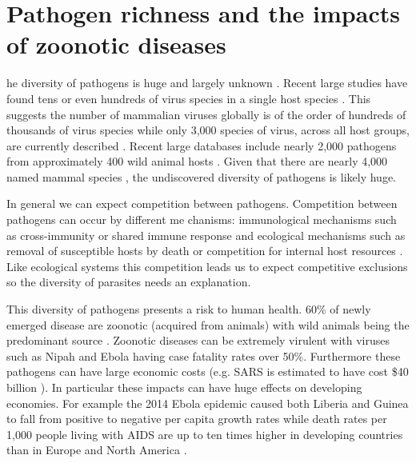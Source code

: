 
\section{Pathogen richness and the impacts of zoonotic diseases}



he diversity of pathogens is huge and largely unknown \cite{poulin2014parasite}.
Recent large studies have found tens \cite{anthony2013strategy} or even hundreds of virus species in a single host species \cite{anthony2015non}.
This suggests the number of mammalian viruses globally is of the order of hundreds of thousands of virus species \cite{anthony2013strategy} while only 3,000 species of virus, across all host groups, are currently described \cite{ICTV}.
Recent large databases include nearly 2,000 pathogens from approximately 400 wild animal hosts \cite{wardeh2015database}.
Given that there are nearly 4,000 named mammal species \cite{wilson2005mammal}, the undiscovered diversity of pathogens is likely huge.

In general we can expect competition between pathogens.
Competition between pathogens can occur by different me	chanisms: immunological mechanisms such as cross-immunity or shared immune response \cite{fenton2010applying} and ecological mechanisms such as removal of susceptible hosts by death \cite{rohani2003ecological} or competition for internal host resources \cite{griffiths2014analysis}.
Like ecological systems this competition leads us to expect competitive exclusions \cite{bremermann1989competitive, martcheva2013competitive, ackleh2003competitive, ackleh2014robust, turner2002impact} so the diversity of parasites needs an explanation.


This diversity of pathogens presents a risk to human health.
60\% of newly emerged disease are zoonotic (acquired from animals) with wild animals being the predominant source \cite{jones2008global, woolhouse2006host, taylor2001risk}.
Zoonotic diseases can be extremely virulent with viruses such as Nipah \cite{luby2009recurrent} and Ebola \cite{lefebvre2014case} having case fatality rates over 50\%.
Furthermore these pathogens can have large economic costs (e.g. SARS is estimated to have cost \$40 billion \cite{knobler2004learning}).
In particular these impacts can have huge effects on developing economies.
For example the 2014 Ebola epidemic caused both Liberia and Guinea to fall from positive to negative per capita growth rates \cite{ebolaWorldbank, ebola2015worldbank} while death rates per 1,000 people living with AIDS are up to ten times higher in developing countries than in Europe and North America \cite{granich2015trends}.


